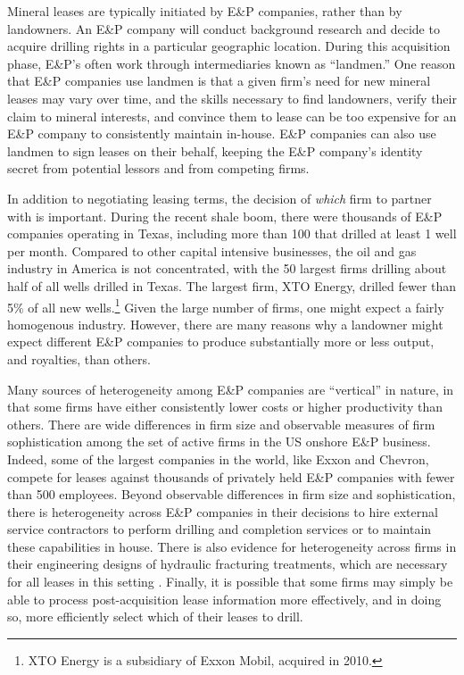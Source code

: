 \documentclass[12pt]{article}
\begin{document}
Mineral leases are typically initiated by E\&P companies, rather than by landowners. An E\&P company will conduct background research and decide to acquire drilling rights in a particular geographic location. During this acquisition phase, E\&P's often work through intermediaries known as ``landmen.'' One reason that E\&P companies use landmen is that a given firm's need for new mineral leases may vary over time, and the skills necessary to find landowners, verify their claim to mineral interests, and convince them to lease can be too expensive for an E\&P company to consistently maintain in-house. E\&P companies can also use landmen to sign leases on their behalf, keeping the E\&P company's identity secret from potential lessors and from competing firms. 

In addition to negotiating leasing terms, the decision of \emph{which} firm to partner with is important.  During the recent shale boom, there were thousands of E\&P companies operating in Texas, including more than 100 that drilled at least 1 well per month.  Compared to other capital intensive businesses, the oil and gas industry in America is not concentrated, with the 50 largest firms drilling about half of all wells drilled in Texas.  The largest firm, XTO Energy, drilled fewer than 5\% of all new wells.\footnote{XTO Energy is a subsidiary of Exxon Mobil, acquired in 2010.}  Given the large number of firms, one might expect a fairly homogenous industry.  However, there are many reasons why a landowner might expect different E\&P companies to produce substantially more or less output, and royalties, than others.

Many sources of heterogeneity among E\&P companies are ``vertical'' in nature, in that some firms have either consistently lower costs or higher productivity than others.  There are wide differences in firm size and observable measures of firm sophistication among the set of active firms in the US onshore E\&P business.  Indeed, some of the largest companies in the world, like Exxon and Chevron, compete for leases against thousands of privately held E\&P companies with fewer than 500 employees.  Beyond observable differences in firm size and sophistication, there is heterogeneity across E\&P companies in their decisions to hire external service contractors to perform drilling and completion services or to maintain these capabilities in house.  There is also evidence for heterogeneity across firms in their engineering designs of hydraulic fracturing treatments, which are necessary for all leases in this setting \citep{bib:covert}.  Finally, it is possible that some firms may simply be able to process post-acquisition lease information more effectively, and in doing so, more efficiently select which of their leases to drill.  
\end{document}
